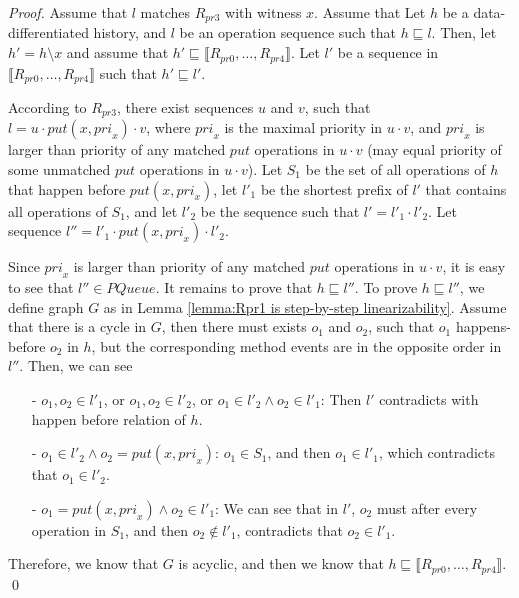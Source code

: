 \documentclass{llncs}
\begin{document}
\begin {proof}

Assume that $l$ matches $R_{\textit{pr3}}$ with witness $x$. Assume that  Let $h$ be a data-differentiated history, and $l$ be an operation sequence such that $h \sqsubseteq l$. Then, let $h'=h \setminus x$ and assume that $h' \sqsubseteq \llbracket R_{\textit{pr0}},\ldots,R_{\textit{pr4}} \rrbracket$. Let $l'$ be a sequence in $\llbracket R_{\textit{pr0}},\ldots,R_{\textit{pr4}} \rrbracket$ such that $h' \sqsubseteq l'$.

According to $R_{\textit{pr3}}$, there exist sequences $u$ and $v$, such that $l=u \cdot \textit{put}(x,\textit{pri}_x) \cdot v$, where $\textit{pri}_x$ is the maximal priority in $u \cdot v$, and $\textit{pri}_x$ is larger than priority of any matched $\textit{put}$ operations in $u \cdot v$ (may equal priority of some unmatched $\textit{put}$ operations in $u \cdot v$). Let $S_1$ be the set of all operations of $h$ that happen before $\textit{put}(x,\textit{pri}_x)$, let $l'_1$ be the shortest prefix of $l'$ that contains all operations of $S_1$, and let $l'_2$ be the sequence such that $l' = l'_1 \cdot l'_2$. Let sequence $l'' = l'_1 \cdot \textit{put}(x,\textit{pri}_x) \cdot l'_2$.

Since $\textit{pri}_x$ is larger than priority of any matched $\textit{put}$ operations in $u \cdot v$, it is easy to see that $l'' \in \textit{PQueue}$. It remains to prove that $h \sqsubseteq l''$. To prove $h \sqsubseteq l''$, we define graph $G$ as in Lemma \ref{lemma:Rpr1 is step-by-step linearizability}. Assume that there is a cycle in $G$, then there must exists $o_1$ and $o_2$, such that $o_1$ happens-before $o_2$ in $h$, but the corresponding method events are in the opposite order in $l''$. Then, we can see

\begin{itemize}
\setlength{\itemsep}{0.5pt}
\item[-] $o_1,o_2 \in l'_1$, or $o_1,o_2 \in l'_2$, or $o_1 \in l'_2 \wedge o_2 \in l'_1$: Then $l'$ contradicts with happen before relation of $h$.

\item[-] $o_1 \in l'_2 \wedge o_2 = \textit{put}(x,\textit{pri}_x)$: $o_1 \in S_1$, and then $o_1 \in l'_1$, which contradicts that $o_1 \in l'_2$.

\item[-] $o_1 = \textit{put}(x,\textit{pri}_x) \wedge o_2 \in l'_1$: We can see that in $l'$, $o_2$ must after every operation in $S_1$, and then $o_2 \notin l'_1$, contradicts that $o_2 \in l'_1$.
\end{itemize}

Therefore, we know that $G$ is acyclic, and then we know that $h \sqsubseteq \llbracket R_{\textit{pr0}},\ldots,R_{\textit{pr4}} \rrbracket$. \qed
\end {proof}
\end{document}
